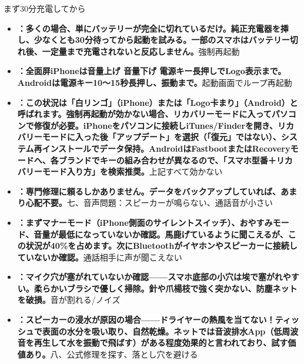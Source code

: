 
まず30分充電してから

\begin{itemize}
  \item \textbf{：多くの場合、単にバッテリーが完全に切れているだけ。純正充電器を挿し、少なくとも30分待ってから起動を試みる。一部のスマホはバッテリー切れ後、一定量まで充電されないと反応しません。}強制再起動
  \item \textbf{：全面屏iPhoneは音量上げ 音量下げ 電源キー長押しでLogo表示まで。Androidは電源キー10〜15秒長押し、振動まで。}起動画面でループ再起動
  \item \textbf{：この状況は「白リンゴ」（iPhone）または「Logo卡まり」（Android）と呼ばれます。強制再起動が効かない場合、リカバリーモードに入ってパソコンで修復が必要。iPhoneをパソコンに接続しiTunes/Finderを開き、リカバリーモードに入った後「アップデート」を選択（「復元」ではない）、システム再インストールでデータ保持。AndroidはFastbootまたはRecoveryモードへ、各ブランドでキーの組み合わせが異なるので、「スマホ型番＋リカバリーモード入り方」を検索推奨。}上記すべて効かない
  \item \textbf{：専門修理に頼るしかありません。データをバックアップしていれば、あまり心配不要。}七、音声問題：スピーカーが鳴らない、通話音が小さい
\end{itemize}


\begin{itemize}
  \item \textbf{：まずマナーモード（iPhone側面のサイレントスイッチ）、おやすみモード、音量が最低になっていないか確認。馬鹿げているように聞こえるが、この状況が40\%を占めます。次にBluetoothがイヤホンやスピーカーに接続していないか確認。}通話相手に声が聞こえない
  \item \textbf{：マイク穴が塞がれていないか確認——スマホ底部の小穴は埃で塞がれやすい。柔らかいブラシで優しく掃除。針や爪楊枝で強く突かない、防塵ネットを破損。}音が割れる/ノイズ
  \item \textbf{：スピーカーの浸水が原因の場合——ドライヤーの熱風を当てない！ティッシュで表面の水分を吸い取り、自然乾燥。ネットでは音波排水App（低周波音を再生して水を振動で飛ばす）がある程度効果的と言われており、試す価値あり。}八、公式修理を探す、落とし穴を避ける
\end{itemize}


